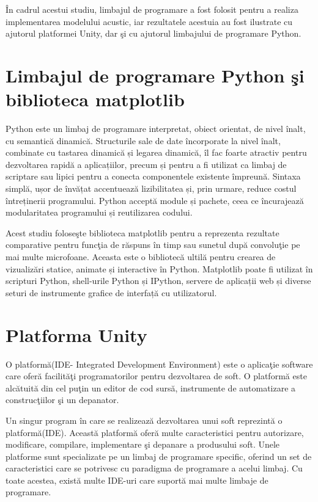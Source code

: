 	\^{I}n cadrul acestui studiu, limbajul de programare a fost folosit pentru a realiza implementarea modelului acustic, iar rezultatele acestuia au fost ilustrate cu ajutorul platformei Unity, dar \c{s}i cu ajutorul limbajului de programare Python.
	
\section{Limbajul de programare Python \c{s}i biblioteca matplotlib}

	Python este un limbaj de programare interpretat, obiect orientat, de nivel înalt, cu semantică dinamică. Structurile sale de date încorporate la nivel înalt, combinate cu tastarea dinamică și legarea dinamică, îl fac foarte atractiv pentru dezvoltarea rapidă a aplicațiilor, precum și pentru a fi utilizat ca limbaj de scriptare sau lipici pentru a conecta componentele existente împreună. Sintaxa simplă, ușor de învățat accentuează lizibilitatea și, prin urmare, reduce costul întreținerii programului. Python acceptă module și pachete, ceea ce încurajează modularitatea programului și reutilizarea codului.
	\bigskip
	
	Acest studiu folose\c{s}te biblioteca matplotlib pentru a reprezenta rezultate comparative pentru func\c{t}ia de r\u{a}spuns \^{i}n timp sau sunetul dup\u{a} convolu\c{t}ie pe mai multe microfoane. Aceasta este o bibliotecă ultil\u{a} pentru crearea de vizualizări statice, animate și interactive în Python. Matplotlib poate fi utilizat în scripturi Python, shell-urile Python și IPython, servere de aplicații web și diverse seturi de instrumente grafice de interfață cu utilizatorul\cite{python}.
	
\section{Platforma Unity}

	O platform\u{a}(IDE- Integrated Development Environment) este o aplica\c{t}ie software care ofer\u{a} facilit\u{a}\c{t}i programatorilor pentru dezvoltarea de soft. O platform\u{a} este alc\u{a}tuit\u{a} din cel pu\c{t}in un editor de cod surs\u{a}, instrumente de automatizare a construc\c{t}iilor \c{s}i un depanator.
	\bigskip
	
	Un singur program \^{i}n care se realizeaz\u{a} dezvoltarea unui soft reprezint\u{a} o platform\u{a}(IDE). Aceast\u{a} platform\u{a} ofer\u{a} multe caracteristici pentru autorizare, modificare, compilare, implementare \c{s}i depanare a produsului soft. Unele platforme sunt specializate pe un limbaj de programare specific, oferind un set de caracteristici care se potrivesc cu paradigma de programare a acelui limbaj. Cu toate acestea, exist\u{a} multe IDE-uri  care suport\u{a} mai multe limbaje de programare.
	\bigskip
	
